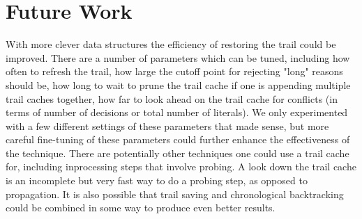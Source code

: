 \documentclass[runningheads]{llncs}
\begin{document}
\section{Future Work}

With more clever data structures the efficiency of restoring the trail
could be improved. There are a number of parameters which can be
tuned, including how often to refresh the trail, how large the cutoff
point for rejecting "long" reasons should be, how long to wait to
prune the trail cache if one is appending multiple trail caches
together, how far to look ahead on the trail cache for conflicts (in
terms of number of decisions or total number of literals). We only
experimented with a few different settings of these parameters that
made sense, but more careful fine-tuning of these parameters could
further enhance the effectiveness of the technique. There are
potentially other techniques one could use a trail cache for,
including inprocessing steps that involve probing. A look down the
trail cache is an incomplete but very fast way to do a probing step,
as opposed to propagation. It is also possible that trail saving and
chronological backtracking could be combined in some way to produce
even better results.

{}

\end{document}
